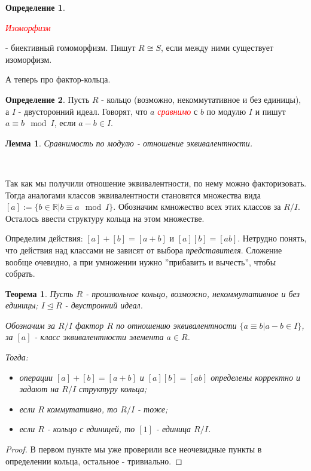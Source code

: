 \documentclass[a4paper,100pt]{article}
\theoremstyle{indented}
\newtheorem{theorem}{Теорема}
\newtheorem{lemma}{Лемма}
\theoremstyle{definition}
\newtheorem{defn}{Определение}
\theoremstyle{remark}
\begin{document}
\begin{defn}
    \hypertarget{n22}{\textcolor{red}{\textit{Изоморфизм}}} - биективный гомоморфизм. Пишут $R\cong S$, если между ними существует изоморфизм.
\end{defn}

А теперь про фактор-кольца.

\begin{defn}
    Пусть $R$ - кольцо (возможно, некоммутативное и без единицы), а $I$ - двусторонний идеал. Говорят, что $a$ \hypertarget{n23}{\textcolor{red}{\textit{сравнимо}}} с $b$ по модулю $I$ и пишут $a\equiv b \mod I$, если $a-b\in I$.
\end{defn}

\begin{lemma}
    Сравнимость по модулю - отношение эквивалентности.
\end{lemma}\

Так как мы получили отношение эквивалентности, по нему можно факторизовать. Тогда аналогами классов эквивалентности становятся множества вида $[a]:=\{b\in \mathbb{R}\vert b\equiv a \mod I\}$. Обозначим кмножество всех этих классов за $R/I$. Осталось ввести структуру кольца на этом множестве.\ 

Определим действия: $[a]+[b]=[a+b]$ и $[a][b]=[ab]$. Нетрудно понять, что действия над классами не зависят от выбора \textit{представителя}. Сложение вообще очевидно, а при умножении нужно ''прибавить и вычесть'',  чтобы собрать.\\

\begin{theorem}
    Пусть $R$ - произвольное кольцо, возможно, некоммутативное и без единицы; $I\trianglelefteq R$ - двустронний идеал.\ 

    Обозначим за $R/I$ фактор $R$ по отношению эквивалентности $\{a\equiv b\vert a-b\in I\}$, за $[a]$ - класс эквивалентности элемента $a\in R$.\ 

    Тогда:
    \begin{itemize}
        \item операции $[a]+[b]=[a+b]$ и $[a][b]=[ab]$ определены корректно и задают на $R/I$ структуру кольца;
        \item если $R$ коммутативно, то $R/I$ - тоже;
        \item если $R$ - кольцо с единицей, то $[1]$ - единица $R/I$.
    \end{itemize}
\end{theorem}

\begin{proof}
    В первом пункте мы уже проверили все неочевидные пункты в определении кольца, остальное - тривиально.
\end{proof}
\end{document}
